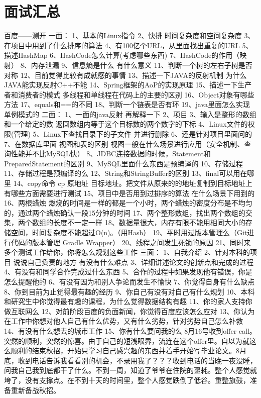 \documentclass[UTF8]{ctexart}
\begin{document}
\section{面试汇总}
百度——测开
一面：
1、基本的Linux指令
2、快排 时间复杂度和空间复杂度
3、在项目中用到了什么排序的算法
4、有100亿个URL，从里面找出重复的URL
5、描述HashMap 
6、HashCode怎么计算(考虑哪些东西)
7、HashCode的作用（映射）
8、内存泄漏
9、信息熵是什么 有什么意义
11、判断一个树的左右子树是否对称
12、目前觉得比较有成就感的事情
13、描述一下JAVA的反射机制 为什么JAVA能实现反射C++不能
14、Spring框架的AoP的实现原理
15、描述一下生产者和消费者的模式 多线程和单线程在代码上的主要的区别
16、Object对象有哪些方法
17、equals和==的不同
18、判断一个链表是否有环
19、java里面怎么实现单例模式的
二面：
1、一面的java反射 再解释一下
2、项目
3、输入是整形的数组和一个给定的数 返回数组内等于这个目标数的两个数字的下标
4、Linux文件的权限(管理)
5、Linux下查找目录下的子文件 并进行删除
6、还是针对项目里面问的
7、在数据库里面 视图和表的区别 视图一般在什么场景进行应用（安全机制、查询性能并不比MySQL快）
8、JDBC连接数据的时候，Statement和PreparedStatement的区别
9、MySQL里面什么东西是预编译的
10、存储过程
11、存储过程是预编译的么
12、String和StringBuffer的区别
13、final可以用在哪里
14、copy命令 cp 原地址 目标地址。把文件从原来的的地址复制到目标地址上 有哪些方面需要进行测试
15、项目中是否用到过排序的算法 在什么场景下用到的
16、两根蜡烛 燃烧的时间是一样的都是一个小时，两个蜡烛的密度分布是不均匀的，通过两个蜡烛确认一段15分钟的时间
17、两个整形数组，找出两个数组的交集，两个数组的长度不一定一样
18、数据量很大，内存有限不能用相同大小的存储空间，时间复杂度不能超过O(n)。（用Hash）
19、平时用过版本管理么（Git进行代码的版本管理 Gradle Wrapper）
20、线程之间发生死锁的原因
21、同时来多个测试工作给你，你将怎么规划这些工作
三面：
1、自我介绍
2、针对本科的项目 说说自己负责的地方 有没有什么难点
3、详细讲述论文的创新点和完成的过程
4、有没有和同学合作完成过什么东西
5、合作的过程中如果发现他有错误，你是怎么提醒他的
6、有没有因为和别人争论而发生不愉快
7、你觉得自身有什么缺点
8、你到目前为止觉得最有趣的经历
9、你自己有没有对自己有什么规划
10、本科和研究生中你觉得最有趣的课程，为什么觉得数据结构有趣
11、你的家人支持你做互联网么
12、对前阶段百度的负面新闻，你觉得百度应该怎么应对
13、你认为在工作中你想对他人自己有什么优势，又有什么劣势，针对劣势自己怎么补救
14、有没有什么想去的城市工作
15、你有什么要问我的么
8月16号收到offer call。突然的顺利，突然的惊喜。由于自己的短浅眼界，流连在这个offer里。自以为就这么顺利的结束秋招，开始只学习自己感兴趣的东西并着手开始写毕业论文。8月底，收到电话告诉我看看别的机会，不录用我了？？？收到电话的当晚一夜没睡，问我自己我到底都干了什么。不到一周，知道了爷爷在住院的噩耗。整个人感觉就垮了，没有支撑点。在不到十天的时间里，整个人感觉跌倒了低谷。重整旗鼓，准备重新备战秋招。
\end{document}
